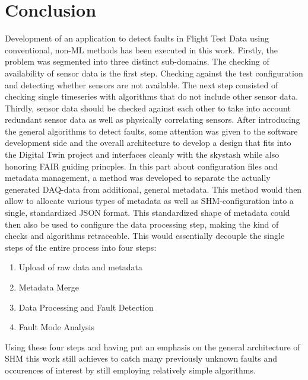 \chapter{Conclusion}
Development of an application to detect faults in Flight Test Data using conventional, non-ML methods has been executed in this work. Firstly, the problem was segmented into three distinct sub-domains. The checking of availability of sensor data is the first step. Checking against the test configuration and detecting whether sensors are not available. The next step consisted of checking single timeseries with algorithms that do not include other sensor data.  Thirdly, sensor data should be checked against each other to take into account redundant sensor data as well as physically correlating sensors. After introducing the general algorithms to detect faults, some attention was given to the software development side and the overall architecture to develop a design that fits into the Digital Twin project and interfaces cleanly with the skystash while also honoring FAIR guiding princples. In this part about configuration files and metadata management, a method was developed to separate the actually generated DAQ-data from additional, general metadata. This method would then allow to allocate various types of metadata as well as SHM-configuration into a single, standardized JSON format. This standardized shape of metadata could then also be used to configure the data processing step, making the kind of checks and algorithms retraceable. This would essentially decouple the single steps of the entire process into four steps:

\begin{enumerate}
        \item Upload of raw data and metadata
        \item Metadata Merge
        \item Data Processing and Fault Detection
        \item Fault Mode Analysis
\end{enumerate}

Using these four steps and having put an emphasis on the general architecture of SHM this work still achieves to catch many previously unknown faults and occurences of interest by still employing relatively simple algorithms.

